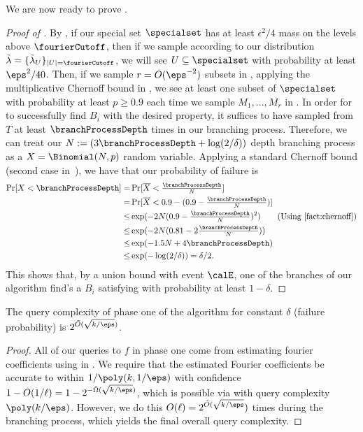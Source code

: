 We are now ready to prove .
\begin{proof}[Proof of ]
 By , if our special set $\specialset$ has at least $\epsilon^2/4$ mass on the levels above $\fourierCutoff$, then if we sample according to our distribution $\tilde{\lambda} = \{\tilde{\lambda}_U\}_{|U|=\fourierCutoff}$, we will see $U \subseteq \specialset$ with probability at least $\eps^2/40$. Then, if we sample $r = O(\eps^{-2})$ subsets in , applying the multiplicative Chernoff bound in , we see at least one subset of $\specialset$ with probability at least $p \geq 0.9$ each time we  sample $M_1,...,M_r$ in . In order for  to successfully find $B_i$ with the desired  property, it suffices to have sampled from $T$ at least $\branchProcessDepth$ times in our  branching process. Therefore, we can treat our $N:=(3\branchProcessDepth+\log(2/\delta))$  depth branching process as a $X = \Binomial(N, p)$ random variable.  Applying a  standard Chernoff bound (second case in~), we have that our probability of failure is 
 \begin{align*}
 \Pr[X < \branchProcessDepth] = & \Pr[\overline{X} < \tfrac{\branchProcessDepth}{N}] \\
 =& \Pr[\overline{X} < 0.9 - (0.9- \tfrac{\branchProcessDepth}{N})] \\
 \leq & \exp (-2N(0.9-\tfrac{\branchProcessDepth}{N})^2) \tag{Using \Cref{fact:chernoff}}\\
\leq &\exp (-2N(0.81-2\tfrac{\branchProcessDepth}{N} )) \\
 \leq & \exp(-1.5N + 4 \branchProcessDepth) \\
 \le & \exp(-\log(2/\delta)) = \delta/2.
 \end{align*}
  This shows that, by a union bound with event $\calE$, one of the branches of our algorithm find's a $B_i$ satisfying  with probability at least $1-\delta$.
\end{proof}

\begin{claim}
\label{claim:phase-one-query-complexity}
The query complexity of phase one of the algorithm for constant $\delta$ (failure probability) is $2^{\tilde{O}(\sqrt{k/\eps})}$.
\end{claim}

\begin{proof}
All of our queries to $f$ in phase one come from estimating fourier coefficients using  in . 
We require that the estimated Fourier coefficients be accurate to within $1/\poly(k,1/\eps)$ with confidence $1- O(1/\ell) = 1- 2^{-\tilde{\Omega}(\sqrt{k/\eps})}$, which is possible via  with query complexity $\poly(k/\eps)$. However, we do this $O(\ell) = 2^{\tilde{O}(\sqrt{k/\eps}})$ times during the branching process, which yields the final overall query complexity. 
\end{proof}


